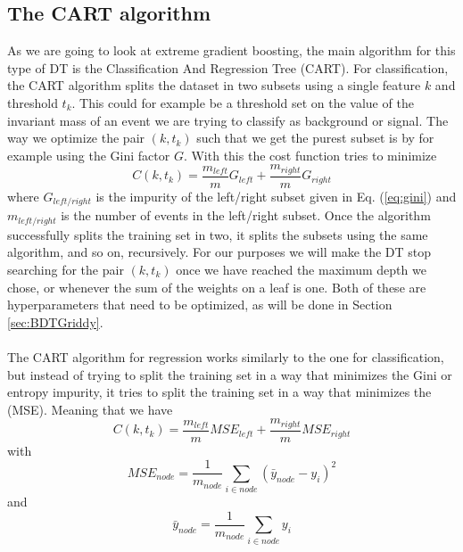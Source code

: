 \documentclass[12pt, a4paper]{book}
\begin{document}
\subsection{The CART algorithm} 
As we are going to look at extreme gradient boosting, the main algorithm for this type of DT is the Classification And Regression Tree (CART). For classification, the CART algorithm splits the dataset in two subsets using a single feature $k$ and threshold $t_k$. This could for example be 
a threshold set on the value of the invariant mass of an event we are trying to classify as background or signal. The way we optimize the pair $(k,t_k)$ such that we get the purest subset is by for example using the Gini factor $G$. With this the cost function tries to minimize
$$
C(k,t_k)=\frac{m_{left}}{m}G_{left}+\frac{m_{right}}{m}G_{right}
$$
where $G_{left/right}$ is the impurity of the left/right subset given in Eq. (\ref{eq:gini}) and $m_{left/right}$ is the number of events in the left/right subset. Once the algorithm successfully splits the training set in two, it splits the subsets using the same algorithm, and so on, 
recursively. For our purposes we will make the DT stop searching for the pair $(k,t_k)$ once we have reached the maximum depth we chose, or whenever the sum of the weights on a leaf is one. Both of these are hyperparameters that need to be optimized, as will be done in Section \ref{sec:BDTGriddy}.\\
\\The CART algorithm for regression works similarly to the one for classification, but instead of trying to split the training set in a way that minimizes the Gini or entropy impurity, it tries to split the training set in a way that minimizes the (MSE). Meaning that we have
$$
C(k,t_k)=\frac{m_{left}}{m}MSE_{left}+\frac{m_{right}}{m}MSE_{right}
$$
with
$$
MSE_{node} = \frac{1}{m_{node}}\sum_{i\in node}(\bar{y}_{node} -y_i)^2
$$
and
$$
\bar{y}_{node} = \frac{1}{m_{node}}\sum_{i\in node}y_i
$$
\end{document}
